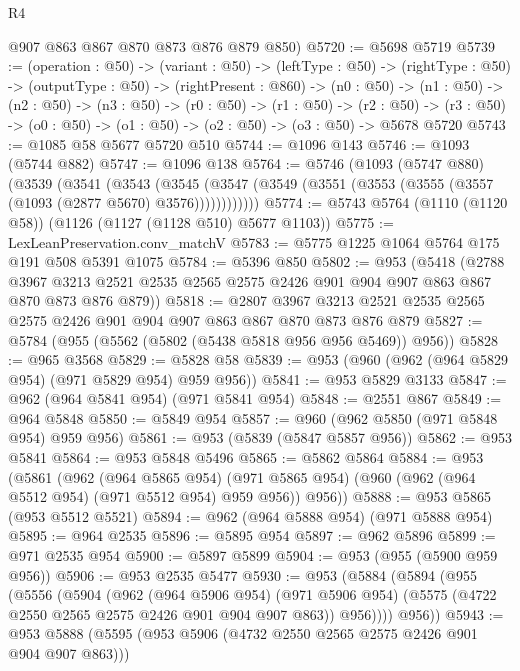 \begin{lexlean}{R4}
\begin{coremodule}
      @907
      @863
      @867
      @870
      @873
      @876
      @879
      @850)
@5720 := @5698 @5719
@5739 := (operation : @50) ->
  (variant : @50) ->
  (leftType : @50) ->
  (rightType : @50) ->
  (outputType : @50) ->
  (rightPresent : @860) ->
  (n0 : @50) ->
  (n1 : @50) ->
  (n2 : @50) ->
  (n3 : @50) ->
  (r0 : @50) ->
  (r1 : @50) ->
  (r2 : @50) -> (r3 : @50) -> (o0 : @50) -> (o1 : @50) -> (o2 : @50) -> (o3 : @50) -> @5678 @5720
@5743 := @1085 @58 @5677 @5720 @510
@5744 := @1096 @143
@5746 := @1093 (@5744 @882)
@5747 := @1096 @138
@5764 := @5746
    (@1093
      (@5747 @880)
      (@3539
        (@3541
          (@3543
            (@3545 (@3547 (@3549 (@3551 (@3553 (@3555 (@3557 (@1093 (@2877 @5670) @3576))))))))))))
@5774 := @5743 @5764 (@1110 (@1120 @58)) (@1126 (@1127 (@1128 @510) @5677 @1103))
@5775 := LexLeanPreservation.conv_matchV
@5783 := @5775 @1225 @1064 @5764 @175 @191 @508 @5391 @1075
@5784 := @5396 @850
@5802 := @953
    (@5418
      (@2788
        @3967
        @3213
        @2521
        @2535
        @2565
        @2575
        @2426
        @901
        @904
        @907
        @863
        @867
        @870
        @873
        @876
        @879))
@5818 := @2807
    @3967
    @3213
    @2521
    @2535
    @2565
    @2575
    @2426
    @901
    @904
    @907
    @863
    @867
    @870
    @873
    @876
    @879
@5827 := @5784 (@955 (@5562 (@5802 (@5438 @5818 @956 @956 @5469)) @956))
@5828 := @965 @3568
@5829 := @5828 @58
@5839 := @953 (@960 (@962 (@964 @5829 @954) (@971 @5829 @954) @959 @956))
@5841 := @953 @5829 @3133
@5847 := @962 (@964 @5841 @954) (@971 @5841 @954)
@5848 := @2551 @867
@5849 := @964 @5848
@5850 := @5849 @954
@5857 := @960 (@962 @5850 (@971 @5848 @954) @959 @956)
@5861 := @953 (@5839 (@5847 @5857 @956))
@5862 := @953 @5841
@5864 := @953 @5848 @5496
@5865 := @5862 @5864
@5884 := @953
    (@5861
      (@962
        (@964 @5865 @954)
        (@971 @5865 @954)
        (@960 (@962 (@964 @5512 @954) (@971 @5512 @954) @959 @956))
        @956))
@5888 := @953 @5865 (@953 @5512 @5521)
@5894 := @962 (@964 @5888 @954) (@971 @5888 @954)
@5895 := @964 @2535
@5896 := @5895 @954
@5897 := @962 @5896
@5899 := @971 @2535 @954
@5900 := @5897 @5899
@5904 := @953 (@955 (@5900 @959 @956))
@5906 := @953 @2535 @5477
@5930 := @953
    (@5884
      (@5894
        (@955
          (@5556
            (@5904
              (@962
                (@964 @5906 @954)
                (@971 @5906 @954)
                (@5575 (@4722 @2550 @2565 @2575 @2426 @901 @904 @907 @863))
                @956))))
        @956))
@5943 := @953 @5888 (@5595 (@953 @5906 (@4732 @2550 @2565 @2575 @2426 @901 @904 @907 @863)))

\end{coremodule}
\end{lexlean}
